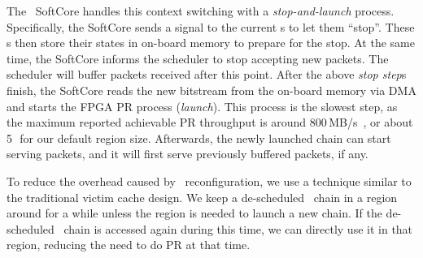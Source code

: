 The \snic\ SoftCore handles this context switching with a {\em stop-and-launch} process.
Specifically, the SoftCore sends a signal to the current \nt{}s to let them ``stop''.
These \nt{}s then store their states in on-board memory to prepare for the stop.
At the same time, the SoftCore informs the scheduler to stop accepting new packets. 
The scheduler will buffer packets received after this point.
After the above {\em stop step}s finish, the SoftCore reads the new bitstream from the on-board memory via DMA and starts the FPGA PR process ({\em launch}).
This process is the slowest step, as the maximum reported achievable PR throughput is around 800\,MB/s~\cite{coyote-osdi20}, or about 5\,\ms\ for our default region size.
Afterwards, the newly launched chain can start serving packets, and it will first serve previously buffered packets, if any.


To reduce the overhead caused by \nt\ reconfiguration, we use a technique similar to the traditional victim cache design. We keep a de-scheduled \nt\ chain in a region around for a while unless the region is needed to launch a new chain. If the de-scheduled \nt\ chain is accessed again during this time, we can directly use it in that region, reducing the need to do PR at that time.



